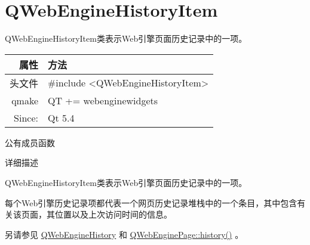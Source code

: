 \chapter{QWebEngineHistoryItem}

QWebEngineHistoryItem类表示Web引擎页面历史记录中的一项。

\begin{tabular}{|r|l|}
	\hline
	属性 & 方法 \\
	\hline
	头文件 & \#include <QWebEngineHistoryItem>\\      
	\hline
	qmake & QT += webenginewidgets\\      
	\hline
	Since: & Qt 5.4\\
	\hline
\end{tabular}


公有成员函数


详细描述

QWebEngineHistoryItem类表示Web引擎页面历史记录中的一项。

每个Web引擎历史记录项都代表一个网页历史记录堆栈中的一个条目，其中包含有关该页面，其位置以及上次访问时间的信息。

另请参见 \href{https://github.com/QtDocumentCN/QtDocumentCN/blob/master/Src/W/QWebEngineHistoryItem/qwebenginehistory.html}{QWebEngineHistory} 和 \href{https://github.com/QtDocumentCN/QtDocumentCN/blob/master/Src/W/QWebEngineHistoryItem/qwebenginepage.html#history}{QWebEnginePage::history()} 。

